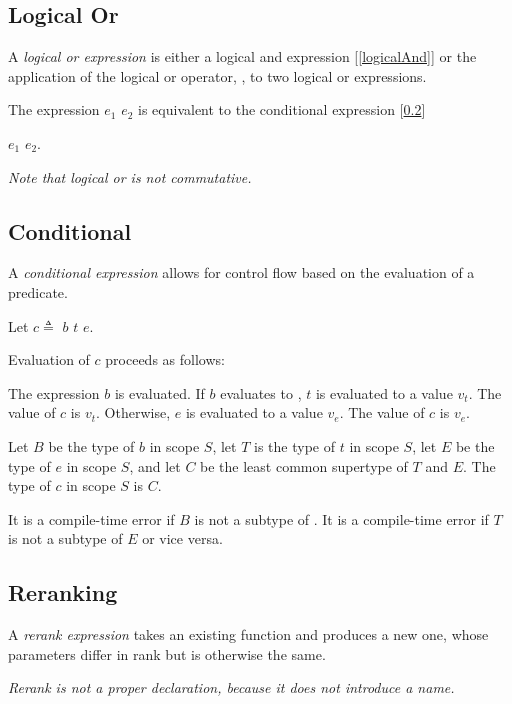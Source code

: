 \documentclass{article}
\begin{document}
{\subsection{Logical Or}
\label{logicalOr}

A {\em logical or expression} is either a logical and expression [\ref{logicalAnd}] or the application of the logical or operator, \AND{}, to two logical or expressions.

\OrExpression{}

The expression $e_1$ \OR{} $e_2$ is equivalent to the conditional expression [\ref{conditional}] 

\IF{} $e_1$ \THEN{} \TRUE{} \ELSE{} $e_2$.

{\em
Note that logical or is not commutative.
}


\subsection{Conditional}
\label{conditional}

A {\em conditional expression} allows for control flow based on the evaluation of a predicate.

\ConditionalExpression{}

Let $c \triangleq $ \IF{} $b$ \THEN{} $t$ \ELSE{} $e$.

Evaluation of $c$ proceeds as follows:

The expression $b$ is evaluated. 
If $b$ evaluates to \TRUE{}, $t$ is evaluated to a value $v_t$. The value of $c$ is $v_t$. Otherwise, $e$ is evaluated to a value $v_e$. The value of $c$ is $v_e$.

Let $B$ be the type of $b$ in scope $S$, let $T$ is the type of $t$ in scope $S$, let $E$ be the type of $e$ in scope $S$, and let $C$ be the least common supertype of $T$ and $E$. The type of $c$  in scope $S$ is $C$. 

It is a compile-time error if $B$ is not a subtype of \BOOL{}. It is a compile-time error if $T$ is not a subtype of $E$ or vice versa. 

\subsection{Reranking}
\label{reranking}

A {\em rerank expression} takes an existing function and produces a new one, whose parameters differ in rank but is otherwise the same.

{\em
Rerank is not a proper declaration, because it does not introduce a name. 
}

}
\end{document}
